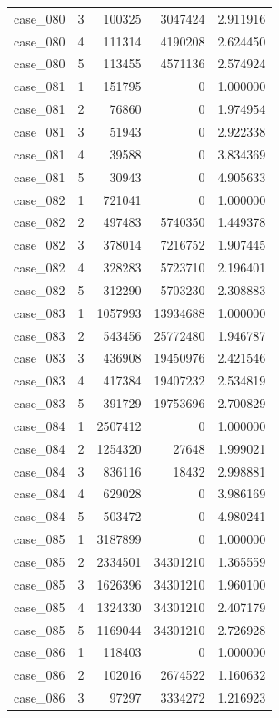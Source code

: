 \begin{longtable}{lrrrr}
case\_080 & 3 & 100325 & 3047424 & 2.911916 \\
case\_080 & 4 & 111314 & 4190208 & 2.624450 \\
case\_080 & 5 & 113455 & 4571136 & 2.574924 \\
case\_081 & 1 & 151795 & 0 & 1.000000 \\
case\_081 & 2 & 76860 & 0 & 1.974954 \\
case\_081 & 3 & 51943 & 0 & 2.922338 \\
case\_081 & 4 & 39588 & 0 & 3.834369 \\
case\_081 & 5 & 30943 & 0 & 4.905633 \\
case\_082 & 1 & 721041 & 0 & 1.000000 \\
case\_082 & 2 & 497483 & 5740350 & 1.449378 \\
case\_082 & 3 & 378014 & 7216752 & 1.907445 \\
case\_082 & 4 & 328283 & 5723710 & 2.196401 \\
case\_082 & 5 & 312290 & 5703230 & 2.308883 \\
case\_083 & 1 & 1057993 & 13934688 & 1.000000 \\
case\_083 & 2 & 543456 & 25772480 & 1.946787 \\
case\_083 & 3 & 436908 & 19450976 & 2.421546 \\
case\_083 & 4 & 417384 & 19407232 & 2.534819 \\
case\_083 & 5 & 391729 & 19753696 & 2.700829 \\
case\_084 & 1 & 2507412 & 0 & 1.000000 \\
case\_084 & 2 & 1254320 & 27648 & 1.999021 \\
case\_084 & 3 & 836116 & 18432 & 2.998881 \\
case\_084 & 4 & 629028 & 0 & 3.986169 \\
case\_084 & 5 & 503472 & 0 & 4.980241 \\
case\_085 & 1 & 3187899 & 0 & 1.000000 \\
case\_085 & 2 & 2334501 & 34301210 & 1.365559 \\
case\_085 & 3 & 1626396 & 34301210 & 1.960100 \\
case\_085 & 4 & 1324330 & 34301210 & 2.407179 \\
case\_085 & 5 & 1169044 & 34301210 & 2.726928 \\
case\_086 & 1 & 118403 & 0 & 1.000000 \\
case\_086 & 2 & 102016 & 2674522 & 1.160632 \\
case\_086 & 3 & 97297 & 3334272 & 1.216923 \\

\end{longtable}

